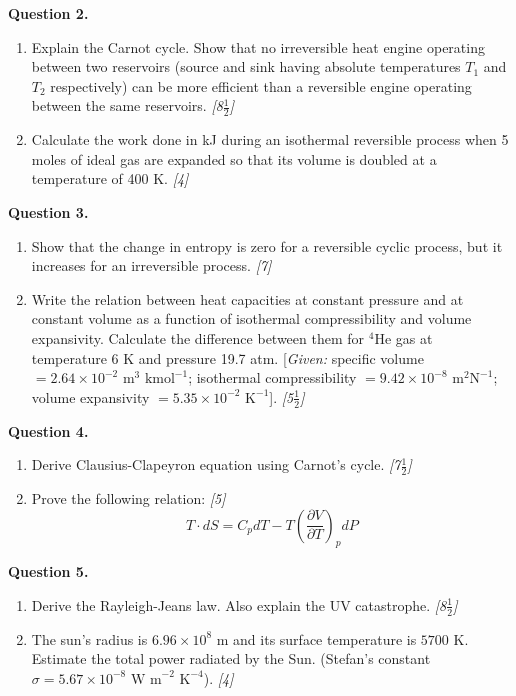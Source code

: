 \documentclass[11pt,a4paper]{article}
\newcommand{\pts}[1]{\hfill \textit{[#1]}}
\begin{document}
\bigskip

\noindent \textbf{Question 2.}
\begin{enumerate}[label=(\alph*)]
  \item Explain the Carnot cycle. Show that no irreversible heat engine operating between two reservoirs (source and sink having absolute temperatures $T_1$ and $T_2$ respectively) can be more efficient than a reversible engine operating between the same reservoirs. \pts{8$\frac{1}{2}$}
  \item Calculate the work done in kJ during an isothermal reversible process when 5 moles of ideal gas are expanded so that its volume is doubled at a temperature of 400 K. \pts{4}
\end{enumerate}

\bigskip

\noindent \textbf{Question 3.}
\begin{enumerate}[label=(\alph*)]
  \item Show that the change in entropy is zero for a reversible cyclic process, but it increases for an irreversible process. \pts{7}
  \item Write the relation between heat capacities at constant pressure and at constant volume as a function of isothermal compressibility and volume expansivity. Calculate the difference between them for $^4\text{He}$ gas at temperature 6 K and pressure 19.7 atm. [\textit{Given:} specific volume $= 2.64 \times 10^{-2}\text{ m}^3\text{ kmol}^{-1}$; isothermal compressibility $= 9.42 \times 10^{-8}\text{ m}^2\text{N}^{-1}$; volume expansivity $= 5.35 \times 10^{-2}\text{ K}^{-1}$]. \pts{5$\frac{1}{2}$}
\end{enumerate}

\bigskip

\noindent \textbf{Question 4.}
\begin{enumerate}[label=(\alph*)]
  \item Derive Clausius-Clapeyron equation using Carnot's cycle. \pts{7$\frac{1}{2}$}
  \item Prove the following relation: \pts{5}
  \[ T \cdot dS = C_p dT - T \left(\frac{\partial V}{\partial T}\right)_p dP \]
\end{enumerate}

\bigskip

\noindent \textbf{Question 5.}
\begin{enumerate}[label=(\alph*)]
  \item Derive the Rayleigh-Jeans law. Also explain the UV catastrophe. \pts{8$\frac{1}{2}$}
  \item The sun's radius is $6.96 \times 10^8\text{ m}$ and its surface temperature is $5700\text{ K}$. Estimate the total power radiated by the Sun. (Stefan's constant $\sigma = 5.67 \times 10^{-8}\text{ W m}^{-2}\text{ K}^{-4}$). \pts{4}
\end{enumerate}
\end{document}
